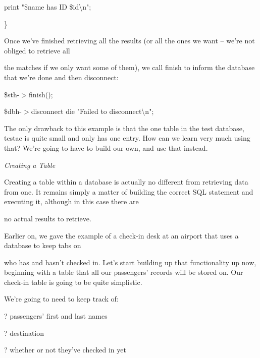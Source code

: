 \documentclass[a4paper,11pt]{book}
\begin{document}
\noindent print "\$name has ID \$id\textbackslash n";

\noindent \}

\noindent 

\noindent 

\noindent Once we've finished retrieving all the results (or all the ones we want -- we're not obliged to retrieve all

\noindent the matches if we only want some of them), we call finish to inform the database that we're done and then disconnect:

\noindent 

\noindent \$sth-$>$finish();

\noindent 

\noindent \$dbh-$>$disconnect \textbar \textbar  die "Failed to disconnect\textbackslash n";

\noindent 

\noindent The only drawback to this example is that the one table in the test database, testac is quite small and only has one entry. How can we learn very much using that? We're going to have to build our own, and use that instead.

\noindent 

\noindent \textit{Creating a Table}

\noindent Creating a table within a database is actually no different from retrieving data from one. It remains simply a matter of building the correct SQL statement and executing it, although in this case there are

\noindent no actual results to retrieve.

\noindent 

\noindent Earlier on, we gave the example of a check-in desk at an airport that uses a database to keep tabs on

\noindent who has and hasn't checked in. Let's start building up that functionality up now, beginning with a table that all our passengers' records will be stored on. Our check-in table is going to be quite simplistic.

\noindent We're going to need to keep track of:

\noindent 

\noindent ? passengers' first and last names

\noindent 

\noindent ? destination

\noindent 

\noindent ? whether or not they've checked in yet
\end{document}
